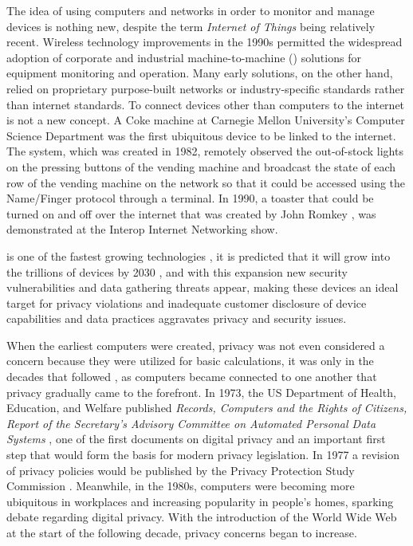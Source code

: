The idea of using computers and networks in order to monitor and manage
devices is nothing new, despite the term \textit{Internet of Things} being
relatively recent.
Wireless technology improvements in the 1990s permitted the widespread
adoption of corporate and industrial machine-to-machine (\hyperlink{\acronym}{\acronym}) solutions
for equipment monitoring and operation. Many early \hyperlink{\acronym}{\acronym} solutions, on the
other hand, relied on proprietary purpose-built networks or industry-specific
standards rather than internet standards. To connect devices other than
computers to the internet is not a new concept. A Coke machine at Carnegie
Mellon University's Computer Science Department \cite{EverhartInteresting}
was the first ubiquitous device to be linked to the internet. The system,
which was created in 1982, remotely observed the out-of-stock lights on
the pressing buttons of the vending machine and broadcast the state of each
row of the vending machine on the network so that it could be accessed using
the Name/Finger protocol through a terminal. In 1990, a toaster that could
be turned on and off over the internet that was created by John Romkey \cite{RomkeyToast},
was demonstrated at the Interop Internet Networking show.

\hyperlink{\acronym}{\acronym} is one of the fastest growing technologies \cite{MohammadState}, it
is predicted that it will grow into the trillions of devices by 2030 \cite{SarawiInternet},
and with this expansion new security vulnerabilities and data gathering
threats appear, making these devices an ideal target for
privacy violations and inadequate customer disclosure of device capabilities
and data practices aggravates privacy and security issues.

When the earliest computers were created, privacy was not even considered
a concern because they were utilized for basic calculations, it was only in
the decades that followed \cite{hoffman1969computers}, as computers became connected to one another that privacy gradually came to
the forefront. In 1973, the US Department of Health, Education, and Welfare
published \textit{Records, Computers and the Rights of Citizens, Report of the
Secretary's Advisory Committee on Automated Personal Data Systems} \cite{hew1973records},
one of the first documents on digital privacy and an important first step that would
form the basis for modern privacy legislation. In 1977 a revision of privacy
policies would be published by the Privacy Protection Study Commission \cite{united1977personal}.
Meanwhile, in the 1980s, computers were becoming more ubiquitous in workplaces
and increasing popularity in people's homes, sparking debate regarding digital
privacy. With the introduction of the World Wide Web at the start of the following
decade, privacy concerns began to increase.

